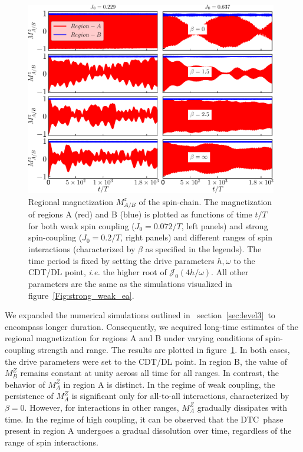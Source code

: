 \documentclass[12pt]{iopart}
\begin{document}
\begin{figure}[h]
	\centering
	\hspace{1.5cm}\includegraphics[width = 11cm]{figure9.pdf}
	\caption{Regional magnetization $M^z_{A/B}$ of the spin-chain. The magnetization of regions A (red) and B (blue) is plotted as functions of time $t/T$ for both weak spin coupling ($J_0=0.072/T$, left panels) and strong spin-coupling ($J_0=0.2/T$, right panels) and different ranges of spin interactions (characterized by $\beta$ as specified in the legends). The time period is fixed by setting the drive parameters $h,\omega$ to the CDT/DL point, \textit{i.e.} the higher root of $\mathcal{J}_0(4h/\omega)$. All other parameters are the same as the simulations visualized in figure~\ref{Fig:strong_weak_ea}.}
	\label{Fig:regiogionalmag}
\end{figure}
We expanded the numerical simulations outlined in  section~\ref{sec:level3} to encompass longer duration. Consequently, we acquired long-time estimates of the regional magnetization for regions A and B under varying conditions of spin-coupling strength and range. The results are plotted in figure~\ref{Fig:regiogionalmag}. In both cases, the drive parameters were set to the CDT/DL point. In region B, the value of $M^Z_B$ remains constant at unity across all time for all ranges. In contrast, the behavior of $M^Z_A$ in region A is distinct. In the regime of weak coupling, the persistence of $M^Z_A$ is significant only for all-to-all interactions, characterized by $\beta=0$. However, for interactions in other ranges, $M^Z_A$ gradually dissipates with time. In the regime of high coupling, it can be observed that the DTC phase present in region A undergoes a gradual dissolution over time, regardless of the range of spin interactions. 
\end{document}
